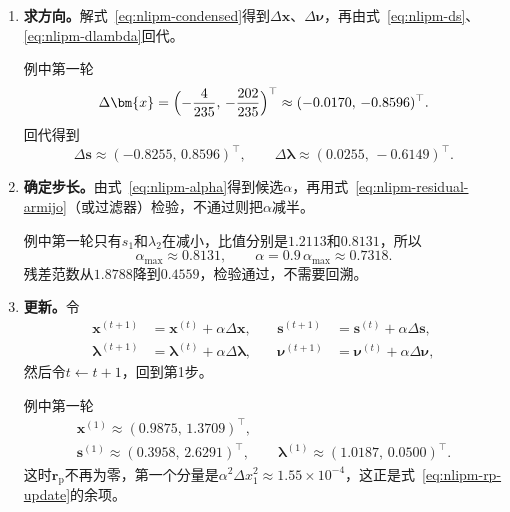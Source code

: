 \begin{enumerate}
 \item \textbf{求方向。}解式~\eqref{eq:nlipm-condensed}得到$\Delta\bm{x}$、$\Delta\bm{\nu}$，再由式~\eqref{eq:nlipm-ds}、\eqref{eq:nlipm-dlambda}回代。

 例中第一轮
 \[
  \Delta\bm{x}=\Bigl(-\frac{4}{235},\,-\frac{202}{235}\Bigr)^\top\approx(-0.0170,\,-0.8596)^\top.
 \]
 回代得到
 \[
  \Delta\bm{s}\approx(-0.8255,\,0.8596)^\top,\qquad\Delta\bm{\lambda}\approx(0.0255,\,-0.6149)^\top.
 \]

 \item \textbf{确定步长。}由式~\eqref{eq:nlipm-alpha}得到候选$\alpha$，再用式~\eqref{eq:nlipm-residual-armijo}（或过滤器）检验，不通过则把$\alpha$减半。

 例中第一轮只有$s_1$和$\lambda_2$在减小，比值分别是$1.2113$和$0.8131$，所以
 \[
  \alpha_{\max}\approx0.8131,\qquad\alpha=0.9\,\alpha_{\max}\approx0.7318.
 \]
 残差范数从$1.8788$降到$0.4559$，检验通过，不需要回溯。

 \item \textbf{更新。}令
 \begin{equation}
  \begin{aligned}
  \bm{x}^{(t+1)}&=\bm{x}^{(t)}+\alpha\Delta\bm{x},\quad&
  \bm{s}^{(t+1)}&=\bm{s}^{(t)}+\alpha\Delta\bm{s},\\
  \bm{\lambda}^{(t+1)}&=\bm{\lambda}^{(t)}+\alpha\Delta\bm{\lambda},\quad&
  \bm{\nu}^{(t+1)}&=\bm{\nu}^{(t)}+\alpha\Delta\bm{\nu},
  \end{aligned}
  \label{eq:nlipm-update}
 \end{equation}
 然后令$t\leftarrow t+1$，回到第1步。

 例中第一轮
 \[
  \begin{gathered}
  \bm{x}^{(1)}\approx(0.9875,\,1.3709)^\top,\\
  \bm{s}^{(1)}\approx(0.3958,\,2.6291)^\top,\qquad\bm{\lambda}^{(1)}\approx(1.0187,\,0.0500)^\top.
  \end{gathered}
 \]
 这时$\bm{r}_{\mathrm{p}}$不再为零，第一个分量是$\alpha^2\Delta x_1^2\approx1.55\times10^{-4}$，这正是式~\eqref{eq:nlipm-rp-update}的余项。
\end{enumerate}

